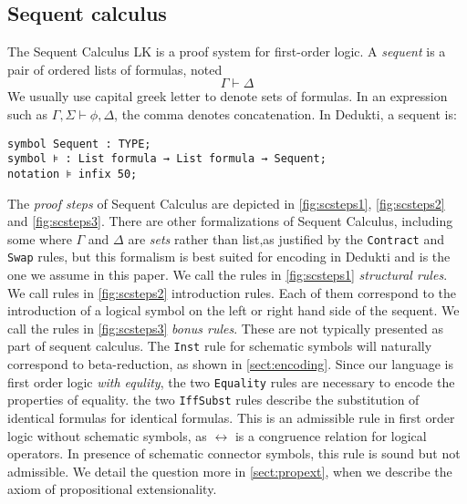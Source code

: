 \documentclass{article}
\begin{document}
	\subsection{Sequent calculus}\label{SSect:sequent-calculus}
	The Sequent Calculus LK is a proof system for first-order logic. A \textit{sequent} is a pair of ordered lists of formulas, noted
	$$
	\Gamma \vdash \Delta
	$$
	We usually use capital greek letter to denote sets of formulas. In an expression such as $\Gamma, \Sigma \vdash \phi, \Delta$, the comma denotes concatenation. In Dedukti, a sequent is:
	\begin{lstlisting}[language=Dialekto, firstnumber=last]
symbol Sequent : TYPE;
symbol ⊧ : List formula → List formula → Sequent;
notation ⊧ infix 50;
	\end{lstlisting}
	The \textit{proof steps} of Sequent Calculus are depicted in \autoref{fig:scsteps1}, \autoref{fig:scsteps2} and \autoref{fig:scsteps3}. There are other formalizations of Sequent Calculus, including some where $\Gamma$ and $\Delta$ are \textit{sets} rather than list,as justified by the \texttt{Contract} and \texttt{Swap} rules, but this formalism is best suited for encoding in Dedukti and is the one we assume in this paper.
	We call the rules in \autoref{fig:scsteps1} \textit{structural rules}. We call rules in \autoref{fig:scsteps2} introduction rules. Each of them correspond to the introduction of a logical symbol on the left or right hand side of the sequent.
	We call the rules in \autoref{fig:scsteps3} \textit{bonus rules}. These are not typically presented as part of sequent calculus. 
	The \texttt{Inst} rule for schematic symbols will naturally correspond to beta-reduction, as shown in \autoref{sect:encoding}.
	Since our language is first order logic \textit{with equlity}, the two \texttt{Equality} rules are necessary to encode the properties of equality. the two \texttt{IffSubst} rules describe the substitution of identical formulas for identical formulas. This is an admissible rule in first order logic without schematic symbols, as $\leftrightarrow$ is a congruence relation for logical operators. In presence of schematic connector symbols, this rule is sound but not admissible. We detail the question more in \autoref{sect:propext}, when we describe the axiom of propositional extensionality.
	
\end{document}

